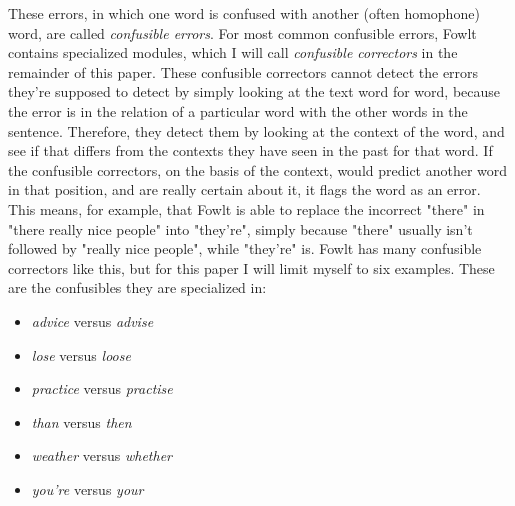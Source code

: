 \documentclass[12pt]{article}
\begin{document}
These errors, in which one word is confused with another (often homophone) word, are called \emph{confusible errors}. For most common confusible errors, Fowlt contains specialized modules, which I will call \emph{confusible correctors} in the remainder of this paper. These confusible correctors cannot detect the errors they're supposed to detect by simply looking at the text word for word, because the error is in the relation of a particular word with the other words in the sentence. Therefore, they detect them by looking at the context of the word, and see if that differs from the contexts they have seen in the past for that word. If the confusible correctors, on the basis of the context, would predict another word in that position, and are really certain about it, it flags the word as an error. This means, for example, that Fowlt is able to replace the incorrect "there" in "there really nice people" into "they're", simply because "there" usually isn't followed by "really nice people", while "they're" is. Fowlt has many confusible correctors like this, but for this paper I will limit myself to six examples. These are the confusibles they are specialized in: 

\begin{itemize}
\item \emph{advice} versus \emph{advise}
\item \emph{lose} versus \emph{loose}
\item \emph{practice} versus \emph{practise}
\item \emph{than} versus \emph{then}
\item \emph{weather} versus \emph{whether}
\item \emph{you're} versus \emph{your}
\end{itemize}
\end{document}
